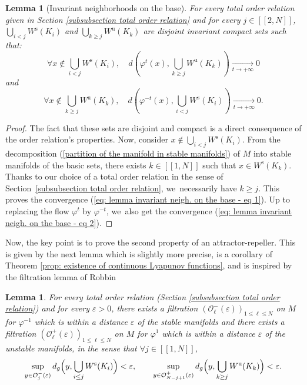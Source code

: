 \documentclass[JEP,XML,SOM,Unicode,NoEqCountersInSection,NoFloatCountersInSection,published]{cedram}
\newcommand{\lcr}{[\![}
\newcommand{\rcr}{]\!]}
\newcommand{\rs}{\mathrm{s}}
\newcommand{\ru}{\mathrm{u}}
\theoremstyle{definition}
\theoremstyle{plain}
\newtheorem{lemma}[definition]{Lemma}
\newcommand{\Ocal}{\mathcal{O}}
\begin{document}
\begin{lemma}[Invariant neighborhoods on the base]\label{lemma: attractor and repeller for the flow on the basis}
For every total order relation given in Section \ref{subsubsection total order relation} and for every $j\in\lcr2,N\rcr$, $\bigcup_{i < j}W^\rs (K_i)$ and $\bigcup_{k \geq j}W^\ru (K_k)$ are disjoint invariant compact sets such that:
\begin{equation}\label{eq: lemma invariant neigh. on the base - eq 1}
\forall x \notin \bigcup_{i < j}W^\rs (K_i), \quad d (\varphi^t (x), \bigcup_{k \geq j}W^\ru (K_k)) \underset{t \to+\infty}{\to} 0
\end{equation}
and
\begin{equation}\label{eq: lemma invariant neigh. on the base - eq 2}
\forall x \notin \bigcup_{k \geq j}W^\ru (K_k), \quad d (\varphi^{-t} (x),\bigcup_{i < j}W^\rs (K_i)) \underset{t \to+\infty}{\to} 0.
\end{equation}
\end{lemma}

\begin{proof}
The fact that these sets are disjoint and compact is a direct consequence of the order relation's properties. Now, consider $x \notin \bigcup_{i < j}W^\rs (K_i)$. From the decomposition (\ref{partition of the manifold in stable manifolds}) of $M$ into stable manifolds of the basic sets, there exists $k\in\lcr1,N\rcr$ such that $x \in W^\rs(K_k)$. Thanks to our choice of a total order relation in the sense of Section~\ref{subsubsection total order relation}, we~necessarily have $k \geq j$. This proves the convergence (\ref{eq: lemma invariant neigh. on the base - eq 1}). Up to replacing the flow $\varphi^t$ by $\varphi^{-t}$, we~also get the convergence (\ref{eq: lemma invariant neigh. on the base - eq 2}).
\end{proof}

Now, the key point is to prove the second property of an attractor-repeller. This is given by the next lemma which is slightly more precise, is a corollary of Theorem \ref{prop: existence of continuous Lyapunov functions}, and is inspired by the filtration lemma of Robbin \cite[7.9]{robbin}

\begin{lemma}\label{lemma: equivalence filtration and unrevisited}
For every total order relation (Section \ref{subsubsection total order relation}) and for every $\varepsilon >0$, there exists a filtration $(\Ocal_{\ell}^- (\varepsilon))_{1\leq \ell \leq N}$ on $M$ for $\varphi^{-1}$ which is within a distance $\varepsilon$ of the stable manifolds and there exists a filtration $(\Ocal_{\ell}^+ (\varepsilon))_{1\leq \ell \leq N}$ on $M$ for $\varphi^{1}$ which is within a distance $\varepsilon$ of the unstable manifolds, in the sense that $\forall j \in \lcr1,N\rcr$,
\[
\sup_{y \in \Ocal_j^- (\varepsilon)} d_g \Bigl(y, \bigcup_{i \leq j} W^\rs (K_i) \Bigr) < \varepsilon, \qquad \sup_{y \in \Ocal_{N-j+1}^+ (\varepsilon)} d_g \Bigl(y, \bigcup_{k \geq j} W^\ru (K_k)\Bigr) < \varepsilon.
\]
\end{lemma}
\end{document}
